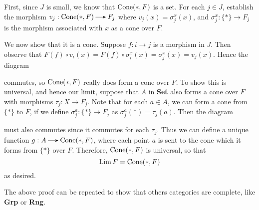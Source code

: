    \begin{prf}
        First, since $J$ is small, we know that $\operatorname{\mathrm{Cone}}(*, F)$ is a 
        set. For each $j \in J$, establish the morphism $v_j: \cone(*,
        F) \to F_j$ where $v_j(x) = \sigma^x_j(x)$, and $\sigma^x_j: \{*\}
        \to F_j$ is the morphism associated with $x$ as a cone over $F$. 

        We now show that it is a cone. 
        Suppose $f: i \to j$ is a morphism in $J$. Then observe that 
        $F(f) \circ v_i(x) = F(f) \circ \sigma^x_i(x) = \sigma^x_j(x)
        = v_j(x)$. Hence the diagram 
        \begin{center}
        \end{center}
        commutes, so $\operatorname{\mathrm{Cone}}(*, F)$ really does form a cone over $F$. 
        To show this is universal, and hence our limit, suppose that 
        $A$ in \textbf{Set} also forms a cone over $F$ with morphisms 
        $\tau_j: X \to F_j$. Note that for each $a \in A$, we can form
        a cone from $\{*\}$ to $F$, if we define $\sigma^a_j: \{*\} 
        \to F_j$ as $\sigma^a_j(*) = \tau_j(a)$. Then the diagram 
        \begin{center}
        \end{center}
        must also commutes since it commutes for each $\tau_j$. 
        Thus we can define a unique 
        function $g: A \to \cone(*, F)$, where each point $a$ is sent to
        the cone which it forms from $\{*\}$ over $F$. Therefore,
        $\operatorname{\mathrm{Cone}}(*, F)$ is universal, so that 
        \[
            \operatorname*{\mathrm{Lim }} F = \operatorname{\mathrm{Cone}}(*, F)
        \]
        as desired. 
    \end{prf}

    The above proof can be repeated to show that others categories are
    complete, like \textbf{Grp} or \textbf{Rng}. 

